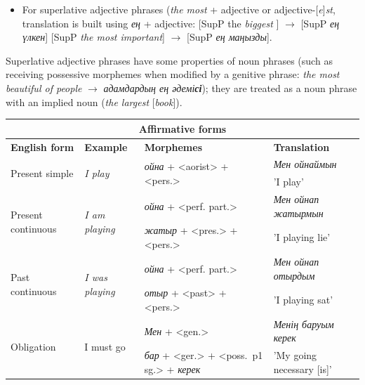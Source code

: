 \documentclass[11pt]{article}
\begin{document}
\begin{description}
\begin{itemize}
\item For superlative adjective phrases  (\emph{the most} + adjective  or adjective-[\emph{e}]\emph{st}, translation 
   is built using \emph{ең} + adjective:  [SupP  the \emph{biggest} ]  $\rightarrow$ [SupP \emph{ең үлкен}] 
   [SupP  \emph{the most important}]   $\rightarrow$ [SupP \emph{ең маңызды}].
\end{itemize}
Superlative adjective phrases have some properties of noun phrases (such as receiving possessive morphemes when 
modified by a genitive phrase: \emph{the most beautiful of people} $\rightarrow$ \emph{адамдардың ең әдемі\textbf{сі}}); they are treated as a noun phrase with an implied noun (\emph{the largest} [\emph{book}]).

\end{description}

\begin{table}
  \centering
  \begin{small}
  \begin{tabular}{|l|l|l|l|}
    \hline
    \multicolumn{4}{|c|}{\textbf{Affirmative forms}} \\
    \hline
    \textbf{English form} & \textbf{Example} & \textbf{Morphemes} & \textbf{Translation} \\
    \hline
    \multirow{2}{*}{Present simple} & \multirow{2}{*}{\emph{I play}} & \multirow{2}{*}{\emph{ойна} + <aorist> + <pers.>} & \emph{Мен ойнаймын} \\
                                    &                         &                                            & 'I play' \\
    \hline
    \multirow{2}{*}{Present continuous} & \multirow{2}{*}{\emph{I am playing}} & \emph{ойна} + <perf. part.>  & \emph{Мен ойнап жатырмын} \\
                                    &                         &   \emph{жатыр} + <pres.> + <pers.>     & 'I playing lie' \\
    \hline
    \multirow{2}{*}{Past continuous} & \multirow{2}{*}{\emph{I was playing}} & \emph{ойна} + <perf. part.>  & \emph{Мен ойнап отырдым} \\
                                    &                         & \emph{отыр} +  <past>  + <pers.>     & 'I playing sat' \\
    \hline
    \multirow{2}{*}{Obligation} & \multirow{2}{*}{I must go} & \emph{Мен}  + <gen.>  & \emph{Менің баруым керек} \\
                                    &                         & \emph{бар} + <ger.> +  <poss.\ p1 sg.> + \emph{керек}    & 'My going necessary [is]' \\

\end{tabular}
\end{small}
\end{table}
\end{document}
